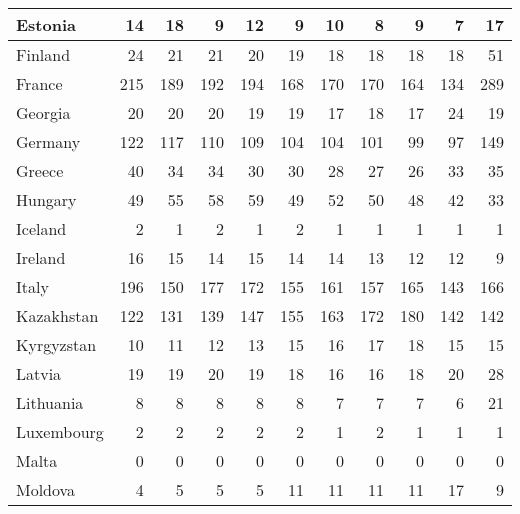 \begin{table}
\begin{tabular}{|l|r|r|r|r|r|r|r|r|r|r|}
                       Estonia&     14&     18&      9&     12&      9&     10&      8&      9&      7&     17\\\hline
                       Finland&     24&     21&     21&     20&     19&     18&     18&     18&     18&     51\\\hline
                        France&    215&    189&    192&    194&    168&    170&    170&    164&    134&    289\\\hline
                       Georgia&     20&     20&     20&     19&     19&     17&     18&     17&     24&     19\\\hline
                       Germany&    122&    117&    110&    109&    104&    104&    101&     99&     97&    149\\\hline
                        Greece&     40&     34&     34&     30&     30&     28&     27&     26&     33&     35\\\hline
                       Hungary&     49&     55&     58&     59&     49&     52&     50&     48&     42&     33\\\hline
                       Iceland&      2&      1&      2&      1&      2&      1&      1&      1&      1&      1\\\hline
                       Ireland&     16&     15&     14&     15&     14&     14&     13&     12&     12&      9\\\hline
                         Italy&    196&    150&    177&    172&    155&    161&    157&    165&    143&    166\\\hline
                    Kazakhstan&    122&    131&    139&    147&    155&    163&    172&    180&    142&    142\\\hline
                    Kyrgyzstan&     10&     11&     12&     13&     15&     16&     17&     18&     15&     15\\\hline
                        Latvia&     19&     19&     20&     19&     18&     16&     16&     18&     20&     28\\\hline
                     Lithuania&      8&      8&      8&      8&      8&      7&      7&      7&      6&     21\\\hline
                    Luxembourg&      2&      2&      2&      2&      2&      1&      2&      1&      1&      1\\\hline
                         Malta&      0&      0&      0&      0&      0&      0&      0&      0&      0&      0\\\hline
                       Moldova&      4&      5&      5&      5&     11&     11&     11&     11&     17&      9\\\hline

\end{tabular}
\end{table}
